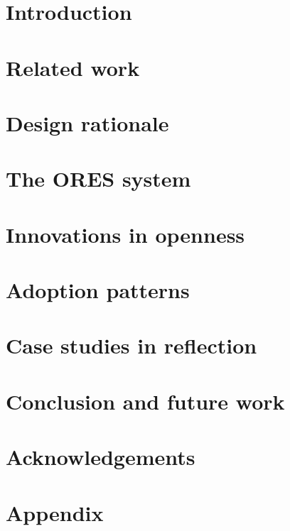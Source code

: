 \section{Introduction}
\label{sec:introduction}


\section{Related work}
\label{sec:related_work}


\section{Design rationale}
\label{sec:design_rationale}


\section{The ORES system}
\label{sec:the_ores_system}


\section{Innovations in openness}
\label{sec:innovations_in_openness}


\section{Adoption patterns}
\label{sec:adoption_patterns}


\section{Case studies in reflection}
\label{sec:case_studies}


\section{Conclusion and future work}
\label{sec:conclusions_and_future_work}


\section{Acknowledgements}
\label{sec:acknowledgements}





\appendix
\section{Appendix}
\label{sec:appendix}

